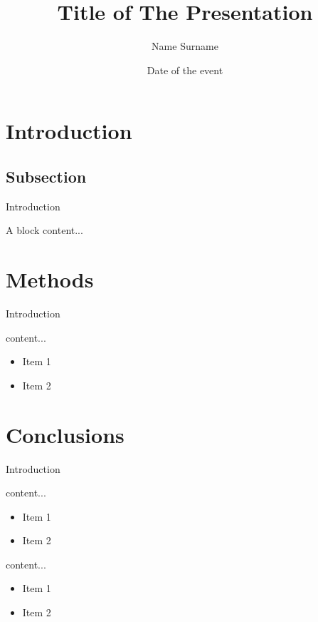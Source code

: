 \documentclass[10pt, aspectratio=169, handout]{uniudpresw}
\author{Name Surname}
\title{Title of The Presentation}
\date{Date of the event}
\begin{document}
	
	\maketitle

	\section{Introduction}
	\subsection{Subsection}
	\begin{frame}{Introduction}
		\onslide<2->\begin{block}{A block}
			content...
		\end{block}
	\end{frame}
	
	\section{Methods}
	\begin{frame}{Introduction}
		\begin{block}{content...}
			\begin{itemize}
				\item Item 1
				\item Item 2
			\end{itemize}
		\end{block}
	\end{frame}
	
	\section{Conclusions}
	\begin{frame}{Introduction}
		\begin{block}{content...}
			\begin{itemize}
				\item Item 1
				\item Item 2
			\end{itemize}
		\end{block}
		
		\begin{block}{content...}
			\begin{itemize}
				\item Item 1
				\item Item 2
			\end{itemize}
		\end{block}
	\end{frame}
\end{document}
